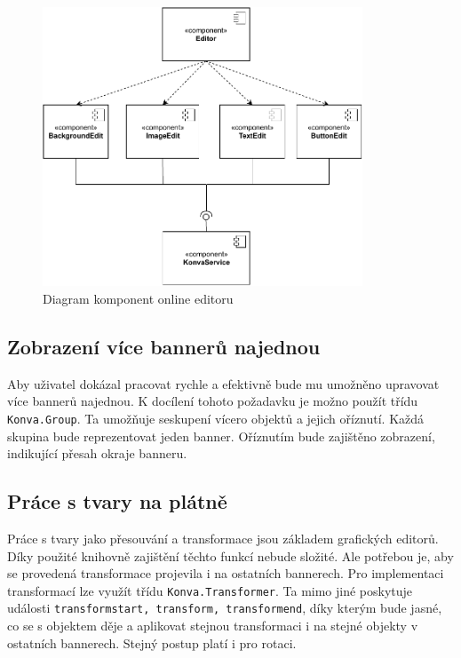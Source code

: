     \begin{figure}[h]
        \centering
        \includegraphics[width=0.85\textwidth]{Figures/component-diagram.pdf}
        \caption[Diagram komponent editoru]{Diagram komponent online editoru}
        \label{fig:component-diagram}
    \end{figure}

        \subsection{Zobrazení více bannerů najednou}
        Aby uživatel dokázal pracovat rychle a efektivně bude mu umožněno upravovat více bannerů najednou. K docílení tohoto požadavku je možno použít
        třídu \texttt{Konva.Group}. Ta umožňuje seskupení vícero objektů a jejich oříznutí.
        Každá skupina bude reprezentovat jeden banner. Oříznutím bude zajištěno zobrazení, indikující přesah okraje banneru.

        \subsection{Práce s tvary na plátně}
        Práce s tvary jako přesouvání a transformace jsou základem grafických editorů. Díky použité knihovně zajištění těchto funkcí nebude složité.
        Ale potřebou je, aby se provedená transformace projevila i na ostatních bannerech. Pro implementaci transformací lze využít třídu \texttt{Konva.Transformer}.
        Ta mimo jiné poskytuje události \texttt{transformstart, transform, transformend}, díky kterým bude jasné, co se s objektem děje a aplikovat stejnou transformaci i
        na stejné objekty v ostatních bannerech. Stejný postup platí i pro rotaci.

